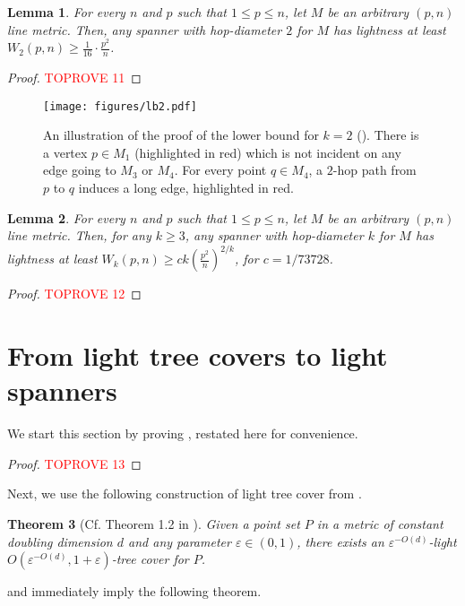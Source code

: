 \documentclass[11pt,english]{article}
\newcommand{\eps}{\varepsilon}
\newtheorem{theorem}{Theorem}[section]
\newtheorem{lemma}[theorem]{Lemma}
\begin{document}
\begin{lemma}\label{st:lb-2}
For every $n$ and $p$ such that $1 \le p \le n$, let $M$ be an arbitrary $(p,n)$ line metric. Then, any spanner with hop-diameter $2$ for $M$ has lightness at least $W_2(p,n) \ge \frac{1}{16}\cdot \frac{p^2}{n}$.
\end{lemma}
\begin{proof}\textcolor{red}{TOPROVE 11}\end{proof}
\begin{figure}        
\texttt{[image: figures/lb2.pdf]}
\caption{An illustration of the proof of the lower bound for $k=2$ (). There is a vertex $p \in M_1$ (highlighted in red) which is not incident on any edge going to $M_3$ or $M_4$. For every point $q \in M_4$, a $2$-hop path from $p$ to $q$ induces a long edge, highlighted in red.}\label{fig:lb-2}
\end{figure}
\begin{lemma}\label{st:lb-k}
For every $n$ and $p$ such that $1 \le p \le n$, let $M$ be an arbitrary $(p,n)$ line metric. Then, for any $k\ge 3$, any spanner with hop-diameter $k$ for $M$ has lightness at least $W_k(p,n) \ge ck\left(\frac{p^2}{n}\right)^{2/k}$, for $c = 1/73728$.
\end{lemma}

\begin{proof}\textcolor{red}{TOPROVE 12}\end{proof} \section{From light tree covers to light spanners}\label{sec:reduction}
We start this section by proving , restated here for convenience.
\reduction*
\begin{proof}\textcolor{red}{TOPROVE 13}\end{proof}

Next, we use the following construction of light tree cover from \cite{CCLST25}.
\begin{theorem}[Cf. Theorem 1.2 in \cite{CCLST25}]\label{st:light-doubling}
Given a point set $P$ in a metric of constant doubling dimension $d$ and any parameter
$\eps \in (0,1)$, there exists an $\eps^{-O(d)}$-light $O(\eps^{-O(d)}, 1+\eps)$-tree cover for $P$.
\end{theorem}
 and   immediately imply the following theorem.

\doubling*
 






\end{document}
